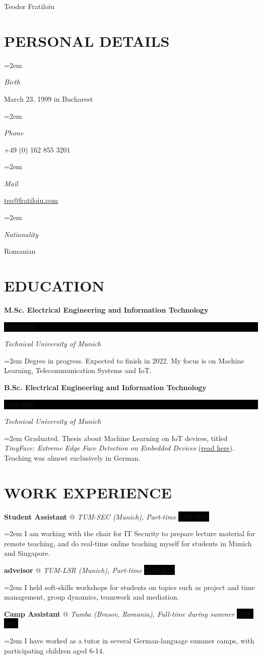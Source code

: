 \documentclass[paper=a4,fontsize=11pt]{scrartcl}
\makeatletter
\newlength{\spacebox}
\newcommand{\sepspace}{\vspace*{1em}}		%
\newcommand{\MyName}[1]{ %
		\Huge \usefont{OT1}{phv}{b}{n} \hfill #1
		\par \normalsize \normalfont}
\newcommand{\MySlogan}[1]{ %
		\large \usefont{OT1}{phv}{m}{n}\hfill \textit{#1}
		\par \normalsize \normalfont}
\newcommand{\NewPart}[1]{\section*{\uppercase{#1}}}
\newcommand{\PersonalEntry}[2]{
		\noindent\hangindent=2em\hangafter=0 %
		\parbox{\spacebox}{        %
		\textit{#1}}		       %
		\hspace{1.5em} #2 \par}    %
\newcommand{\EducationEntry}[4]{
		\noindent \textbf{#1} \hfill      %
		\colorbox{Black}{%
			\parbox{6em}{%
			\hfill\color{White}#2}} \par  %
		\noindent \textit{#3} \par        %
		\noindent\hangindent=2em\hangafter=0 \small #4 %
		\normalsize \par}
\newcommand{\WorkEntry}[4]{				  %
		\noindent \textbf{#1} @ \textit{#3} \hfill      %
		\colorbox{Black}{\color{White}#2} \par  %
		\noindent\hangindent=2em\hangafter=0 \small #4 %
		\normalsize \par}
\makeatother
\begin{document}

\MyName{Teodor Fratiloiu}

\sepspace

\NewPart{Personal details}{}

\PersonalEntry{Birth}{March 23, 1999 in Bucharest}
\PersonalEntry{Phone}{+49 (0) 162 855 3201}
\PersonalEntry{Mail}{\url{teo@fratiloiu.com}}
\PersonalEntry{Nationality}{Romanian}

\NewPart{Education}{}

\EducationEntry{M.Sc. Electrical Engineering and Information Technology}{2020-2022}{Technical University of Munich}{Degree in progress. Expected to finish in 2022. My focus is on Machine Learning, Telecommunication Systems and IoT.}
\sepspace

\EducationEntry{B.Sc. Electrical Engineering and Information Technology}{2017-2020}{Technical University of Munich}{Graduated. Thesis about Machine Learning on IoT devices, titled \textit{TinyFace: Extreme Edge Face Detection on Embedded Devices} (\href{https://github.com/munober/thesis/blob/master/digital_edition.pdf}{\underline{read here}}). Teaching was almost exclusively in German.}

\NewPart{Work experience}{}

\WorkEntry{Student Assistant}{2020-2021}{TUM-SEC (Munich), Part-time}{I am working with the chair for IT Security to prepare lecture material for remote teaching, and do real-time online teaching myself for students in Munich and Singapore.}
\sepspace

\WorkEntry{adveisor}{2018-2019}{TUM-LSR (Munich), Part-time}{I held soft-skills workshops for students on topics such as project and time management, group dynamics, teamwork and mediation.}
\sepspace

\WorkEntry{Camp Assistant}{2017-2019}{Tumba (Brasov, Romania), Full-time during summer}{ I have worked as a tutor in several German-language summer camps, with participating children aged 6-14.}
\sepspace
\end{document}
